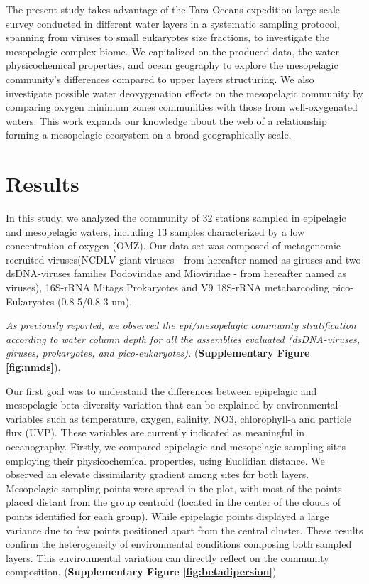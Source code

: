 \documentclass[fleqn,10pt]{wlscirep}
\begin{document}
The present study takes advantage of the Tara Oceans expedition large-scale survey conducted in different water layers in a systematic sampling protocol, spanning from viruses to small eukaryotes size fractions, to investigate the mesopelagic complex biome. We capitalized on the produced data, the water physicochemical properties, and ocean geography to explore the mesopelagic community's differences compared to upper layers structuring. We also investigate possible water deoxygenation effects on the mesopelagic community by comparing oxygen minimum zones communities with those from well-oxygenated waters. This work expands our knowledge about the web of a relationship forming a mesopelagic ecosystem on a broad geographically scale.

\section*{Results}

In this study, we analyzed the community of 32 stations sampled in epipelagic and mesopelagic waters, including 13 samples characterized by a low concentration of oxygen (OMZ). Our data set was composed of metagenomic recruited viruses(NCDLV giant viruses - from hereafter named as giruses and two dsDNA-viruses families Podoviridae and Mioviridae - from hereafter named as viruses), 16S-rRNA Mitags Prokaryotes and V9 18S-rRNA metabarcoding pico-Eukaryotes (0.8-5/0.8-3 um).

\textit{As previously reported, we observed the epi/mesopelagic community stratification according to water column depth for all the assemblies evaluated (dsDNA-viruses, giruses, prokaryotes, and pico-eukaryotes).}  (\textbf{Supplementary Figure \ref{fig:nmds}}). %

Our first goal was to understand the differences between epipelagic and mesopelagic beta-diversity variation that can be explained by environmental variables such as temperature, oxygen, salinity, NO3, chlorophyll-a and particle flux (UVP). These variables are currently indicated as meaningful in oceanography. Firstly, we compared epipelagic and mesopelagic sampling sites employing their physicochemical properties, using Euclidian distance. We observed an elevate dissimilarity gradient among sites for both layers. Mesopelagic sampling points were spread in the plot, with most of the points placed distant from the group centroid (located in the center of the clouds of points identified for each group). While epipelagic points displayed a large variance due to few points positioned apart from the central cluster. %
These results confirm the heterogeneity of environmental conditions composing both sampled layers. This environmental variation can directly reflect on the community composition.  (\textbf{Supplementary Figure \ref{fig:betadipersion}})
\end{document}
